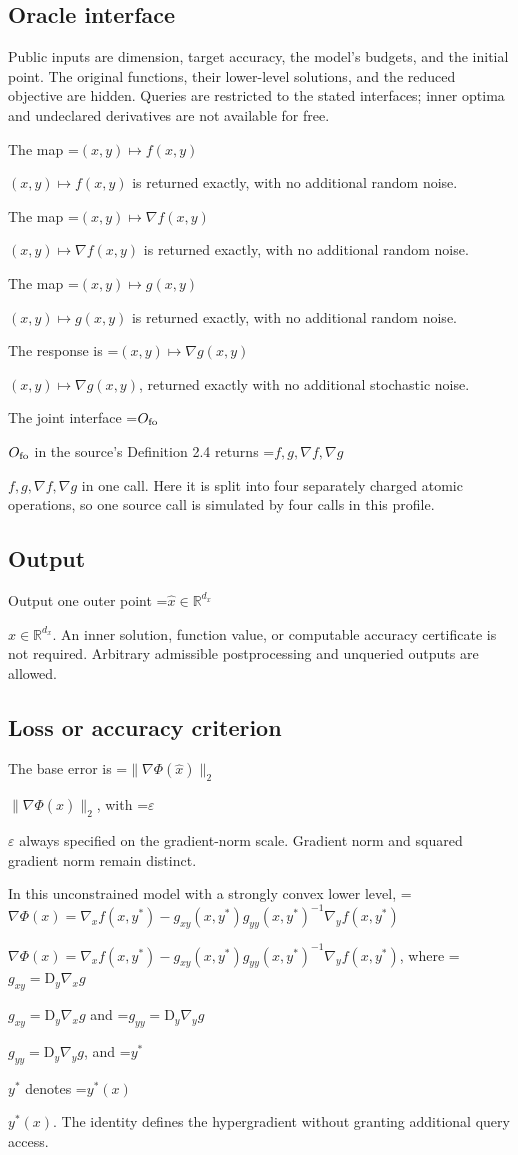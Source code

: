 \documentclass[10pt,a4paper]{article}
\newcommand{\AtlasMath}[1]{\par\begingroup\centering\setbox0=\hbox{$\displaystyle #1$}\ifdim\wd0>1.4\linewidth\typeout{ATLAS WIDE FORMULA: \the\wd0}\fi\ifdim\wd0>\linewidth\resizebox{\linewidth}{!}{\box0}\else\box0\fi\par\endgroup}
\newcommand{\AtlasInlineMath}[1]{\begingroup\setbox0=\hbox{$#1$}\ifdim\wd0>.4\linewidth\endgroup\AtlasMath{#1}\else\endgroup$#1$\fi}
\begin{document}
\subsection{Oracle interface}
Public inputs are dimension, target accuracy, the model's budgets, and the initial point. The original functions, their lower-level solutions, and the reduced objective are hidden. Queries are restricted to the stated interfaces; inner optima and undeclared derivatives are not available for free.

The map \AtlasInlineMath{(x,y)\mapsto f(x,y)} is returned exactly, with no additional random noise.

The map \AtlasInlineMath{(x,y)\mapsto\nabla f(x,y)} is returned exactly, with no additional random noise.

The map \AtlasInlineMath{(x,y)\mapsto g(x,y)} is returned exactly, with no additional random noise.

The response is \AtlasInlineMath{(x,y)\longmapsto \nabla g(x,y)}, returned exactly with no additional stochastic noise.

The joint interface \AtlasInlineMath{O_{\rm fo}} in the source's Definition 2.4 returns \AtlasInlineMath{f,g,\nabla f,\nabla g} in one call. Here it is split into four separately charged atomic operations, so one source call is simulated by four calls in this profile.

\subsection{Output}
Output one outer point \AtlasInlineMath{\widehat{x}\in\mathbb{R}^{d_x}}. An inner solution, function value, or computable accuracy certificate is not required. Arbitrary admissible postprocessing and unqueried outputs are allowed.

\subsection{Loss or accuracy criterion}
The base error is \AtlasInlineMath{\|\nabla\Phi(\widehat{x})\|_2}, with \AtlasInlineMath{\varepsilon} always specified on the gradient-norm scale. Gradient norm and squared gradient norm remain distinct.

In this unconstrained model with a strongly convex lower level, \AtlasInlineMath{\nabla\Phi(x)=\nabla_x f(x,y^*)-g_{xy}(x,y^*)g_{yy}(x,y^*)^{-1}\nabla_y f(x,y^*)}, where \AtlasInlineMath{g_{xy}=\mathrm{D}_y\nabla_x g} and \AtlasInlineMath{g_{yy}=\mathrm{D}_y\nabla_y g}, and \AtlasInlineMath{y^*} denotes \AtlasInlineMath{y^*(x)}. The identity defines the hypergradient without granting additional query access.
\end{document}
